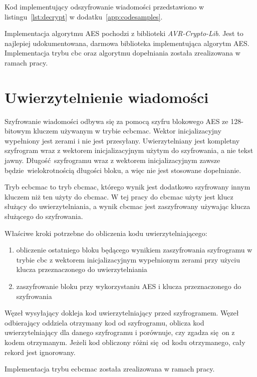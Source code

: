 Kod implementujący odszyfrowanie wiadomości przedstawiono w listingu~\ref{lst:decrypt} w dodatku~\ref{app:codesamples}.

Implementacja algorytmu AES pochodzi z biblioteki \emph{AVR-Crypto-Lib}. Jest to najlepiej udokumentowana, darmowa biblioteka implementująca algorytm AES. Implementacja trybu \gls{cbc} oraz algorytmu dopełniania została zrealizowana w ramach pracy.

\section{Uwierzytelnienie wiadomości}
\label{sec:auth}

Szyfrowanie wiadomości odbywa się za pomocą szyfru blokowego AES ze 128-bitowym kluczem używanym w trybie \gls{ecbcmac}. Wektor inicjalizacyjny wypełniony jest zerami i nie jest przesyłany. Uwierzytelniany jest kompletny szyfrogram wraz z wektorem inicjalizacyjnym użytym do szyfrowania, a nie tekst jawny. Długość szyfrogramu wraz z wektorem inicjalizacyjnym zawsze będzie wielokrotnością długości bloku, a więc nie jest stosowane dopełnianie.

Tryb \gls{ecbcmac} to tryb \gls{cbcmac}, którego wynik jest dodatkowo szyfrowany innym kluczem niż ten użyty do \gls{cbcmac}. W tej pracy do \gls{cbcmac} użyty jest klucz służący do uwierzytelniania, a wynik \gls{cbcmac} jest zaszyfrowany używając klucza służącego do szyfrowania.

Właściwe kroki potrzebne do obliczenia kodu uwierzytelniającego:

\begin{enumerate}
\item obliczenie ostatniego bloku będącego wynikiem zaszyfrowania szyfrogramu w trybie \gls{cbc} z wektorem inicjalizacyjnym wypełnionym zerami przy użyciu klucza przeznaczonego do uwierzytelniania
\item zaszyfrowanie bloku przy wykorzystaniu AES i klucza przeznaczonego do szyfrowania
\end{enumerate}

Węzeł wysyłający dokleja kod uwierzytelniający przed szyfrogramem. Węzeł odbierający oddziela otrzymany kod od szyfrogramu, oblicza kod uwierzytelniający dla danego szyfrogramu i porównuje, czy zgadza się on z kodem otrzymanym. Jeżeli kod obliczony różni się od kodu otrzymanego, cały rekord jest ignorowany.

Implementacja trybu \gls{ecbcmac} została zrealizowana w ramach pracy.
